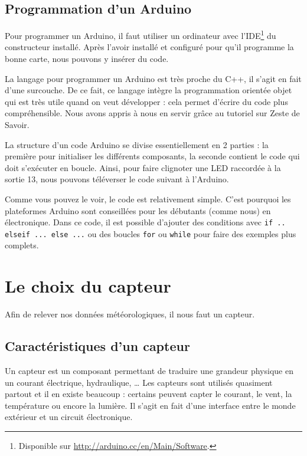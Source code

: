 \subsection{Programmation d'un Arduino}

Pour programmer un Arduino, il faut utiliser un ordinateur avec l'IDE\footnote{Disponible sur \url{http://arduino.cc/en/Main/Software}.} du constructeur installé. Après l'avoir installé et configuré pour qu'il programme la bonne carte, nous pouvons y insérer du code.

La langage pour programmer un Arduino est très proche du C++, il s'agit en fait d'une surcouche. De ce fait, ce langage intègre la programmation orientée objet qui est très utile quand on veut développer : cela permet d'écrire du code plus compréhensible. Nous avons appris à nous en servir grâce au tutoriel \cite{tuto-arduino} sur Zeste de Savoir.

La structure d'un code Arduino se divise essentiellement en 2 parties : la première pour initialiser les différents composants, la seconde contient le code qui doit s'exécuter en boucle. Ainsi, pour faire clignoter une LED raccordée à la sortie 13, nous pouvons téléverser le code suivant à l'Arduino.


Comme vous pouvez le voir, le code est relativement simple. C'est pourquoi les plateformes Arduino sont conseillées pour les débutants (comme nous) en électronique. Dans ce code, il est possible d'ajouter des conditions avec \verb-if .. elseif ... else ...- ou des boucles \verb-for- ou \verb-while- pour faire des exemples plus complets.

\section{Le choix du capteur}

Afin de relever nos données météorologiques, il nous faut un capteur.

\subsection{Caractéristiques d'un capteur}

Un capteur est un composant permettant de traduire une grandeur physique en un courant électrique, hydraulique, \dots{} Les capteurs sont utilisés quasiment partout et il en existe beaucoup : certains peuvent capter le courant, le vent, la température ou encore la lumière. Il s'agit en fait d'une interface entre le monde extérieur et un circuit électronique.

